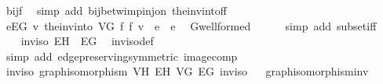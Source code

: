 \begin{isabellebody}
\ bij{\isacharunderscore}{\kern0pt}f\ \isamarkupfalse%
\ {\isacharparenleft}{\kern0pt}simp\ add{\isacharcolon}{\kern0pt}\ bij{\isacharunderscore}{\kern0pt}betw{\isacharunderscore}{\kern0pt}imp{\isacharunderscore}{\kern0pt}inj{\isacharunderscore}{\kern0pt}on\ the{\isacharunderscore}{\kern0pt}inv{\isacharunderscore}{\kern0pt}into{\isacharunderscore}{\kern0pt}f{\isacharunderscore}{\kern0pt}f{\isacharparenright}{\kern0pt}\isanewline
\ \ \isamarkupfalse%
\ \isamarkupfalse%
\ {\isachardoublequoteopen}{\isasymforall}e{\isasymin}E\isactrlsub G{\isachardot}{\kern0pt}\ {\isacharparenleft}{\kern0pt}{\isasymlambda}v{\isachardot}{\kern0pt}\ the{\isacharunderscore}{\kern0pt}inv{\isacharunderscore}{\kern0pt}into\ V\isactrlsub G\ f\ {\isacharparenleft}{\kern0pt}f\ v{\isacharparenright}{\kern0pt}{\isacharparenright}{\kern0pt}\ {\isacharbackquote}{\kern0pt}\ e\ {\isacharequal}{\kern0pt}\ e{\isachardoublequoteclose}\ \isamarkupfalse%
\ G{\isachardot}{\kern0pt}wellformed\isanewline
\ \ \ \ \isamarkupfalse%
\ {\isacharparenleft}{\kern0pt}simp\ add{\isacharcolon}{\kern0pt}\ subset{\isacharunderscore}{\kern0pt}iff{\isacharparenright}{\kern0pt}\isanewline
\ \ \isamarkupfalse%
\ \isamarkupfalse%
\ {\isachardoublequoteopen}{\isacharparenleft}{\kern0pt}{\isacharparenleft}{\kern0pt}{\isacharbackquote}{\kern0pt}{\isacharparenright}{\kern0pt}\ inv{\isacharunderscore}{\kern0pt}iso{\isacharparenright}{\kern0pt}{\isacharbackquote}{\kern0pt}\ E\isactrlsub H\ {\isacharequal}{\kern0pt}\ E\isactrlsub G{\isachardoublequoteclose}\ \isamarkupfalse%
\ inv{\isacharunderscore}{\kern0pt}iso{\isacharunderscore}{\kern0pt}def\ \isamarkupfalse%
\ {\isacharparenleft}{\kern0pt}simp\ add{\isacharcolon}{\kern0pt}\ edge{\isacharunderscore}{\kern0pt}preserving{\isacharbrackleft}{\kern0pt}symmetric{\isacharbrackright}{\kern0pt}\ image{\isacharunderscore}{\kern0pt}comp{\isacharparenright}{\kern0pt}\isanewline
{}\isamarkupfalse%
%
\endisatagproof
{\isafoldproof}%
%
\isadelimproof
\isanewline
%
\endisadelimproof
\isanewline
{}\isamarkupfalse%
\ inv{\isacharunderscore}{\kern0pt}iso{\isacharcolon}{\kern0pt}\ graph{\isacharunderscore}{\kern0pt}isomorphism\ V\isactrlsub H\ E\isactrlsub H\ V\isactrlsub G\ E\isactrlsub G\ inv{\isacharunderscore}{\kern0pt}iso%
\isadelimproof
\ %
\endisadelimproof
%
\isatagproof
{}\isamarkupfalse%
\ graph{\isacharunderscore}{\kern0pt}isomorphism{\isacharunderscore}{\kern0pt}inv\ \isacommand{{\isachardot}{\kern0pt}}\isamarkupfalse%

\end{isabellebody}
